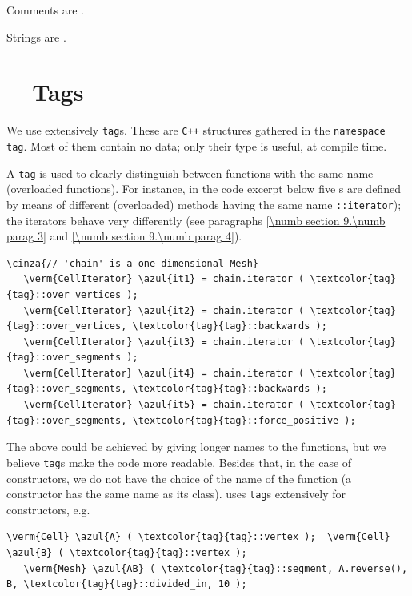 Comments are .

Strings are .


\section{~~Tags}\label{\numb section 11.\numb parag 3}

We use extensively {\small\tt\textcolor{tag}{tag}}s.
These are {\tt C++} structures gathered in the {\small\tt namespace \textcolor{tag}{tag}}.
Most of them contain no data; only their type is useful, at compile time.

A {\small\tt\textcolor{tag}{tag}} is used to clearly distinguish between functions with the same name
(overloaded functions).
For instance, in the code excerpt below five {\small\tt{}}s are defined
by means of different (overloaded) methods having the same name {\small\tt{}::iterator});
the iterators behave very differently (see paragraphs \ref{\numb section 9.\numb parag 3} and
\ref{\numb section 9.\numb parag 4}).

\begin{Verbatim}[commandchars=\\\{\},formatcom=\small\tt,baselinestretch=0.94]
   \cinza{// 'chain' is a one-dimensional Mesh}
   \verm{CellIterator} \azul{it1} = chain.iterator ( \textcolor{tag}{tag}::over_vertices );
   \verm{CellIterator} \azul{it2} = chain.iterator ( \textcolor{tag}{tag}::over_vertices, \textcolor{tag}{tag}::backwards );
   \verm{CellIterator} \azul{it3} = chain.iterator ( \textcolor{tag}{tag}::over_segments );
   \verm{CellIterator} \azul{it4} = chain.iterator ( \textcolor{tag}{tag}::over_segments, \textcolor{tag}{tag}::backwards );
   \verm{CellIterator} \azul{it5} = chain.iterator ( \textcolor{tag}{tag}::over_segments, \textcolor{tag}{tag}::force_positive );
\end{Verbatim}

The above could be achieved by giving longer names to the functions, but we believe
{\small\tt\textcolor{tag}{tag}}s make the code more readable.
Besides that, in the case of constructors, we do not have the choice of the name of the function
(a constructor has the same name as its class).
{\ManiFEM} uses {\small\tt\textcolor{tag}{tag}}s extensively for constructors, e.g.
\begin{Verbatim}[commandchars=\\\{\},formatcom=\small\tt,baselinestretch=0.94]
   \verm{Cell} \azul{A} ( \textcolor{tag}{tag}::vertex );  \verm{Cell} \azul{B} ( \textcolor{tag}{tag}::vertex );
   \verm{Mesh} \azul{AB} ( \textcolor{tag}{tag}::segment, A.reverse(), B, \textcolor{tag}{tag}::divided_in, 10 );
\end{Verbatim}

